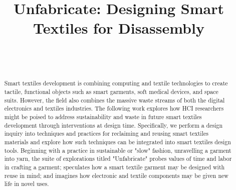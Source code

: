 \documentclass{sigchi}
\def\plaintitle{Unfabricate: Designing Smart Textiles for Disassembly}
\begin{document}
\title{\plaintitle}

\author{
  \\
  \\
}


\maketitle

\begin{abstract}
  Smart textiles development is combining computing and textile technologies to create tactile, functional objects such as smart garments, soft medical devices, and space suits. %
  However, the field also combines the massive waste streams of both the digital electronics and textiles industries. The following work explores how HCI researchers might be poised to address sustainability and waste in future smart textiles development through interventions at design time.  Specifically, we perform a design inquiry into techniques and practices for reclaiming and reusing smart textiles materials and explore how such techniques can be integrated into smart textiles design tools. Beginning with a practice in sustainable or "slow" fashion, unravelling a garment into yarn, the suite of explorations titled "Unfabricate" probes values of time and labor in crafting a garment; speculates how a smart textile garment may be designed with reuse in mind; and imagines how electronic and textile components may be given new life in novel uses.
\end{abstract}
\end{document}
